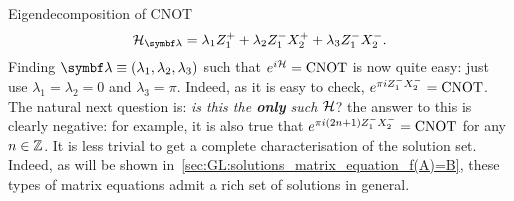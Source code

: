 \begin{examplebox}[label={ex:GL:eigendecomposition_cnot}]{Eigendecomposition of CNOT}
\begin{equation}
    \calH_\bslambda = \lambda_1 Z_1^+ + \lambda_2 Z_1^- X_2^+ + \lambda_3 Z_1^- X_2^-.
\end{equation}
Finding $\bslambda\equiv(\lambda_1,\lambda_2,\lambda_3)$ such that $e^{i{\mathcal{H}}}=\operatorname{CNOT}$ is now quite easy: just use $\lambda_1=\lambda_2=0$ and $\lambda_3=\pi$. Indeed, as it is easy to check, $e^{\pi i Z_1^- X_2^-} = \operatorname{CNOT}$.
The natural next question is: \emph{is this the \textbf{only} such ${\mathcal{H}}$}? the answer to this is clearly negative: for example, it is also true that $e^{\pi i (2n+1) Z_1^- X_2^-}=\operatorname{CNOT}$ for any $n\in{\mathbb{Z}}$.
It is less trivial to get a complete characterisation of the solution set.
Indeed, as will be shown in~\cref{sec:GL:solutions_matrix_equation_f(A)=B}, these types of matrix equations admit a rich set of solutions in general.
\end{examplebox}

